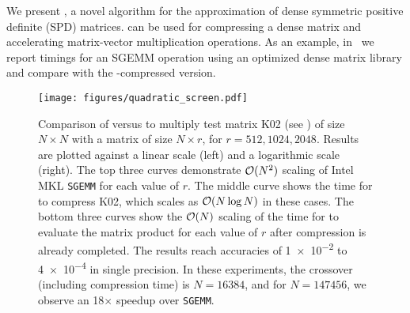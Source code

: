 We present \gofmm{}, a novel  algorithm for the approximation of dense symmetric positive definite (SPD) matrices. \gofmm{} can be used for compressing a dense matrix and accelerating matrix-vector multiplication operations. As an example, in~ we report timings for an SGEMM operation using an optimized dense matrix library and compare with the \gofmm{}-compressed version.
\begin{figure}[!t]
  \centering
  \texttt{[image: figures/quadratic\_screen.pdf]}
  \caption{
					Comparison of  versus  to multiply test matrix K02 (see ) of size $N \times N$
	with a matrix of size $N \times r$, for $r = 512, 1024, 2048$.
	Results are plotted against a linear scale (left) and a logarithmic scale (right).
	The top three curves demonstrate ${\mathcal O}(N^2)$ scaling of Intel MKL \texttt{SGEMM} for
	each value of $r$.
	The middle curve shows the time for \gofmm{} to compress K02,
	which scales as ${\mathcal O}(N\log{N})$ in these cases.
	The bottom three curves show the ${\mathcal O}(N)$ scaling of the time for \gofmm{}
	to evaluate the matrix product for each value of $r$
	after compression is already completed.
	The \gofmm{} results reach accuracies of \num{1e-2} to \num{4e-4} in single precision.
	In these experiments, the crossover (including compression time) is $N=\num{16384}$,
	and for $N=\num{147456}$, we observe an 18$\times$ speedup over \texttt{SGEMM}.
	}
  \label{fig:quadratic}
\end{figure}

